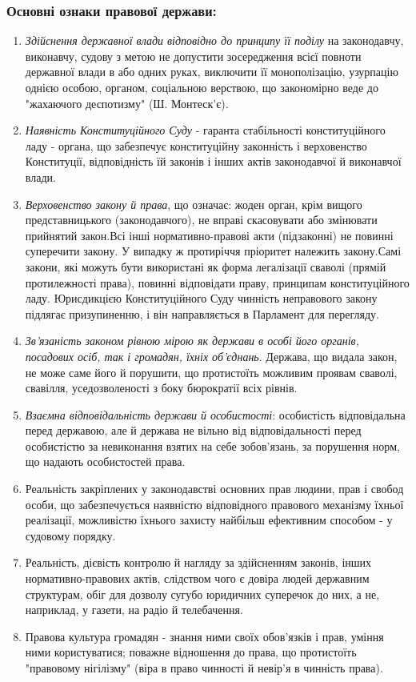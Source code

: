 \subsubsection{Основні ознаки правової держави:}
\begin{enumerate}
\item \textit{Здійснення державної влади відповідно до принципу її поділу} на законодавчу, виконавчу, судову з метою не допустити зосередження всієї повноти державної влади в або одних руках, виключити її монополізацію, узурпацію однією особою, органом, соціальною верствою, що закономірно веде до "жахаючого деспотизму" (Ш. Монтеск'є).
\item \textit{Наявність Конституційного Суду} - гаранта стабільності конституційного ладу - органа, що забезпечує конституційну законність і верховенство Конституції, відповідність їй законів і інших актів законодавчої й виконавчої влади.
\item \textit{Верховенство закону й права}, що означає: жоден орган, крім вищого представницького (законодавчого), не вправі скасовувати або змінювати прийнятий закон.Всі інші нормативно-правові акти (підзаконні) не повинні суперечити закону. У випадку ж протиріччя пріоритет належить закону.Самі закони, які можуть бути використані як форма легалізації сваволі (прямій протилежності права), повинні відповідати праву, принципам конституційного ладу. Юрисдикцією Конституційного Суду чинність неправового закону підлягає призупиненню, і він направляється в Парламент для перегляду.
\item \textit{Зв'язаність законом рівною мірою як держави в особі його органів, посадових осіб, так і громадян, їхніх об'єднань}. Держава, що видала закон, не може саме його й порушити, що протистоїть можливим проявам сваволі, свавілля, уседозволеності з боку бюрократії всіх рівнів.
\item \textit{Взаємна відповідальність держави й особистості}:
особистість відповідальна перед державою, але й держава не вільно від відповідальності перед особистістю за невиконання взятих на себе зобов'язань, за порушення норм, що надають особистостей права.
\item Реальність закріплених у законодавстві основних прав людини, прав і свобод особи, що забезпечується наявністю відповідного правового механізму їхньої реалізації, можливістю їхнього захисту найбільш ефективним способом - у судовому порядку.
\item Реальність, дієвість контролю й нагляду за здійсненням законів, інших нормативно-правових актів, слідством чого є довіра людей державним структурам, обіг для дозволу сугубо юридичних суперечок до них, а не, наприклад, у газети, на радіо й телебачення.
\item Правова культура громадян - знання ними своїх обов'язків і прав, уміння ними користуватися; поважне відношення до права, що протистоїть "правовому нігілізму" (віра в право чинності й невір'я в чинність права).
\end{enumerate}
